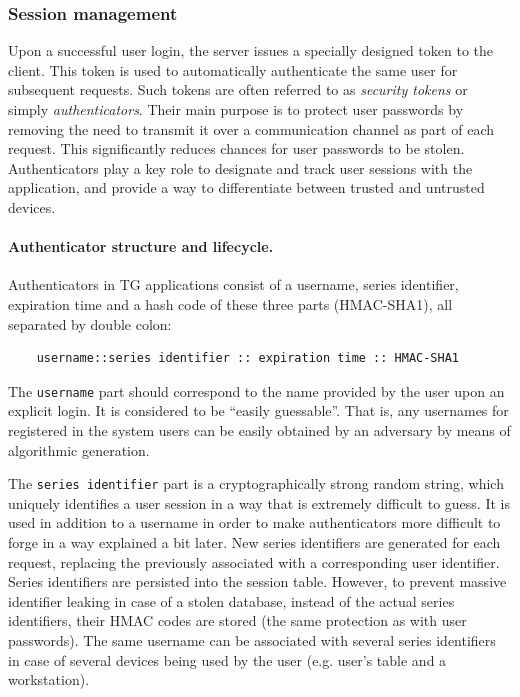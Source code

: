 \documentclass[a4paper,12pt,oneside,openright]{memoir}
\begin{document}
\subsubsection*{Session management}
	Upon a successful user login, the server issues a specially designed token to the client.
	This token is used to automatically authenticate the same user for subsequent requests.
	Such tokens are often referred to as \emph{security tokens} or simply \emph{authenticators}.
	Their main purpose is to protect user passwords by removing the need to transmit it over a communication channel as part of each request.
	This significantly reduces chances for user passwords to be stolen.
	Authenticators play a key role to designate and track user sessions with the application, and provide a way to differentiate between trusted and untrusted devices.

	\paragraph{Authenticator structure and lifecycle.}
	Authenticators in TG applications consist of a username, series identifier, expiration time and a hash code of these three parts (HMAC-SHA1), all separated by double colon:
	\begin{verbatim}
	username::series identifier :: expiration time :: HMAC-SHA1
	\end{verbatim}

	The \texttt{username} part should correspond to the name provided by the user upon an explicit login.
	It is considered to be ``easily guessable''.
	That is, any usernames for registered in the system users can be easily obtained by an adversary by means of algorithmic generation.

	The \texttt{series identifier} part is a cryptographically strong random string, which uniquely identifies a user session in a way that is extremely difficult to guess.
	It is used in addition to a username in order to make authenticators more difficult to forge in a way explained a bit later.
	New series identifiers are generated for each request, replacing the previously associated with a corresponding user identifier.
	Series identifiers are persisted into the session table.
	However, to prevent massive identifier leaking in case of a stolen database, instead of the actual series identifiers, their HMAC codes are stored (the same protection as with user passwords).
	The same username can be associated with several series identifiers in case of several devices being used by the user (e.g. user's table and a workstation).
\end{document}
